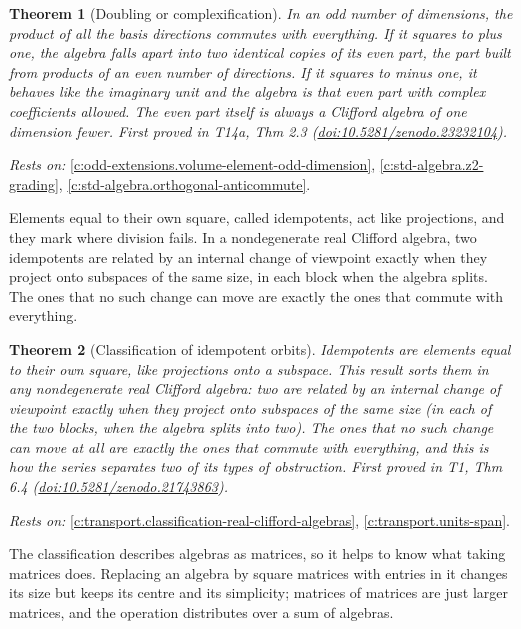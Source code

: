 \documentclass[11pt]{article}
\newtheorem{theorem}{Theorem}[section]
\theoremstyle{definition}
\theoremstyle{plain}
\begin{document}
\begin{theorem}[Doubling or complexification]\label{c:odd-extensions.doubling-or-complexification}
In an odd number of dimensions, the product of all the basis directions commutes with everything. If it squares to plus one, the algebra falls apart into two identical copies of its even part, the part built from products of an even number of directions. If it squares to minus one, it behaves like the imaginary unit and the algebra is that even part with complex coefficients allowed. The even part itself is always a Clifford algebra of one dimension fewer.
\emph{First proved in} T14a, Thm 2.3 (\href{https://doi.org/10.5281/zenodo.23232104}{doi:10.5281/zenodo.23232104}).
\end{theorem}
\noindent\emph{Rests on:} \ref{c:odd-extensions.volume-element-odd-dimension}, \ref{c:std-algebra.z2-grading}, \ref{c:std-algebra.orthogonal-anticommute}.

Elements equal to their own square, called idempotents, act like projections, and they mark where division fails. In a nondegenerate real Clifford algebra, two idempotents are related by an internal change of viewpoint exactly when they project onto subspaces of the same size, in each block when the algebra splits. The ones that no such change can move are exactly the ones that commute with everything.

\begin{theorem}[Classification of idempotent orbits]\label{c:transport.classification-idempotent-orbits}
Idempotents are elements equal to their own square, like projections onto a subspace. This result sorts them in any nondegenerate real Clifford algebra: two are related by an internal change of viewpoint exactly when they project onto subspaces of the same size (in each of the two blocks, when the algebra splits into two). The ones that no such change can move at all are exactly the ones that commute with everything, and this is how the series separates two of its types of obstruction.
\emph{First proved in} T1, Thm 6.4 (\href{https://doi.org/10.5281/zenodo.21743863}{doi:10.5281/zenodo.21743863}).
\end{theorem}
\noindent\emph{Rests on:} \ref{c:transport.classification-real-clifford-algebras}, \ref{c:transport.units-span}.

The classification describes algebras as matrices, so it helps to know what taking matrices does. Replacing an algebra by square matrices with entries in it changes its size but keeps its centre and its simplicity; matrices of matrices are just larger matrices, and the operation distributes over a sum of algebras.
\end{document}
